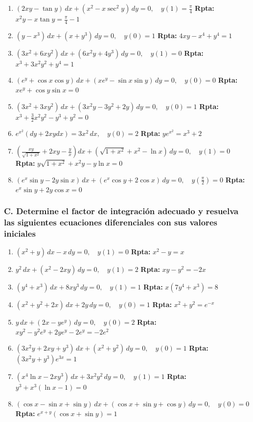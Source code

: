 \documentclass[a4paper,12pt]{article}
\begin{document}
\begin{enumerate}
    \item \((2xy - \tan y)\,dx + (x^2 - x\sec^2 y)\,dy = 0, \quad y(1)=\frac{\pi}{4}\) \hfill \textbf{Rpta:} \(x^2 y - x\tan y = \frac{\pi}{4} - 1\)
    \item \((y - x^3)\,dx + (x + y^3)\,dy = 0, \quad y(0)=1\) \hfill \textbf{Rpta:} \(4xy - x^4 + y^4 = 1\)
    \item \((3x^2 + 6xy^2)\,dx + (6x^2 y + 4y^3)\,dy = 0, \quad y(1)=0\) \hfill \textbf{Rpta:} \(x^3 + 3x^2y^2 + y^4 = 1\)
    \item \((e^y + \cos x \cos y)\,dx + (x e^y - \sin x \sin y)\,dy = 0, \quad y(0)=0\) \hfill \textbf{Rpta:} \(x e^y + \cos y \sin x = 0\)
    \item \((3x^2 + 3xy^2)\,dx + (3x^2y - 3y^2 + 2y)\,dy = 0, \quad y(0)=1\) \hfill \textbf{Rpta:} \(x^3 + \frac{3}{2}x^2y^2 - y^3 + y^2 = 0\)
    \item \(e^{x^2}(dy + 2xydx) = 3x^2\,dx, \quad y(0)=2\) \hfill \textbf{Rpta:} \(y e^{x^2} = x^3 + 2\)
    \item \(\left(\frac{xy}{\sqrt{1+x^2}} + 2xy - \frac{y}{x}\right)dx + (\sqrt{1+x^2} + x^2 - \ln x)\,dy = 0, \quad y(1)=0\) \hfill \textbf{Rpta:} \(y\sqrt{1+x^2} + x^2 y - y\ln x = 0\)
    \item \((e^x \sin y - 2y \sin x)\,dx + (e^x \cos y + 2\cos x)\,dy = 0, \quad y\left(\frac{\pi}{2}\right)=0\) \hfill \textbf{Rpta:} \(e^x \sin y + 2y \cos x = 0\)
\end{enumerate}

\subsubsection*{C. Determine el factor de integración adecuado y resuelva las siguientes ecuaciones diferenciales con sus valores iniciales}

\begin{enumerate}
    \item \((x^2+y)\,dx - x\,dy = 0, \quad y(1)=0\) \hfill \textbf{Rpta:} \(x^2 - y = x\)
    \item \(y^2\,dx + (x^2 - 2xy)\,dy = 0, \quad y(1)=2\) \hfill \textbf{Rpta:} \(xy - y^2 = -2x\)
    \item \((y^4+x^3)\,dx + 8xy^3\,dy = 0, \quad y(1)=1\) \hfill \textbf{Rpta:} \(x(7y^4 + x^3) = 8\)
    \item \((x^2+y^2+2x)\,dx + 2y\,dy = 0, \quad y(0)=1\) \hfill \textbf{Rpta:} \(x^2 + y^2 = e^{-x}\)
    \item \(y\,dx + (2x - y e^y)\,dy = 0, \quad y(0)=2\) \hfill \textbf{Rpta:} \(xy^2 - y^2 e^y + 2y e^y - 2e^y = -2e^2\)
    \item \((3x^2y + 2xy + y^3)\,dx + (x^2 + y^2)\,dy = 0, \quad y(0)=1\) \hfill \textbf{Rpta:} \((3x^2y + y^3)e^{3x} = 1\)
    \item \((x^4 \ln x - 2x y^3)\,dx + 3x^2 y^2\,dy = 0, \quad y(1)=1\) \hfill \textbf{Rpta:} \(y^3 + x^3(\ln x - 1) = 0\)
    \item \((\cos x - \sin x + \sin y)\,dx + (\cos x + \sin y + \cos y)\,dy = 0, \quad y(0)=0\) \hfill \textbf{Rpta:} \(e^{x+y}(\cos x + \sin y) = 1\)
\end{enumerate}
\end{document}
